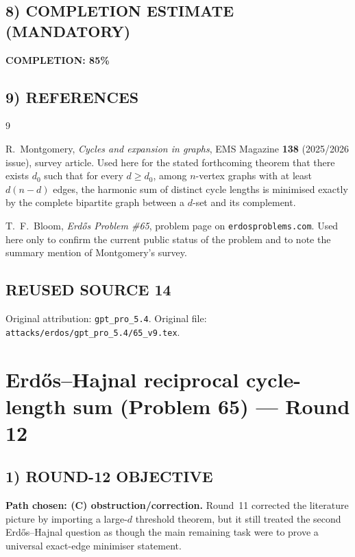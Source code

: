 \subsection*{8) COMPLETION ESTIMATE (MANDATORY)}

\textbf{COMPLETION: 85\%}

\subsection*{9) REFERENCES}

\begin{thebibliography}{9}

R.~Montgomery,
\emph{Cycles and expansion in graphs},
EMS Magazine \textbf{138} (2025/2026 issue), survey article.
Used here for the stated forthcoming theorem that there exists $d_0$ such that for every $d\ge d_0$, among $n$-vertex graphs with at least $d(n-d)$ edges, the harmonic sum of distinct cycle lengths is minimised exactly by the complete bipartite graph between a $d$-set and its complement.

T.~F.~Bloom,
\emph{Erd\H{o}s Problem \#65},
problem page on \texttt{erdosproblems.com}.
Used here only to confirm the current public status of the problem and to note the summary mention of Montgomery's survey.

\end{thebibliography}


\subsection*{REUSED SOURCE 14}
Original attribution: \texttt{gpt\_pro\_5.4}.
Original file: \texttt{attacks/erdos/gpt\_pro\_5.4/65\_v9.tex}.

\section{Erd\H{o}s--Hajnal reciprocal cycle-length sum (Problem 65) --- Round 12}

\subsection*{1) ROUND-12 OBJECTIVE}

\textbf{Path chosen: (C) obstruction/correction.}
Round~11 corrected the literature picture by importing a large-$d$ threshold theorem, but it still treated the second Erd\H{o}s--Hajnal question as though the main remaining task were to prove a universal exact-edge minimiser statement.

